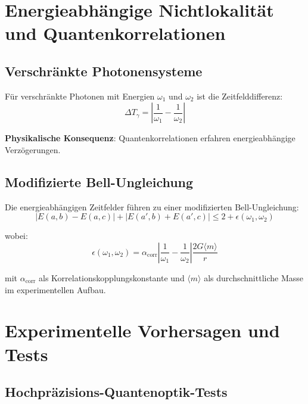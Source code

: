 	\section{Energieabhängige Nichtlokalität und Quantenkorrelationen}
	
	\subsection{Verschränkte Photonensysteme}
	
	Für verschränkte Photonen mit Energien $\omega_1$ und $\omega_2$ ist die Zeitfelddifferenz:
	\begin{equation}
		\Delta T_\gamma = \left|\frac{1}{\omega_1} - \frac{1}{\omega_2}\right|
		\label{eq:time_field_difference}
	\end{equation}
	
	\textbf{Physikalische Konsequenz}: Quantenkorrelationen erfahren energieabhängige Verzögerungen.
	
	\subsection{Modifizierte Bell-Ungleichung}
	
	Die energieabhängigen Zeitfelder führen zu einer modifizierten Bell-Ungleichung:
	\begin{equation}
		|E(a,b) - E(a,c)| + |E(a',b) + E(a',c)| \leq 2 + \epsilon(\omega_1, \omega_2)
		\label{eq:modified_bell_inequality}
	\end{equation}
	
	wobei:
	\begin{equation}
		\epsilon(\omega_1, \omega_2) = \alpha_{\text{corr}} \left|\frac{1}{\omega_1} - \frac{1}{\omega_2}\right| \frac{2G\langle m \rangle}{r}
		\label{eq:bell_correction}
	\end{equation}
	
	mit $\alpha_{\text{corr}}$ als Korrelationskopplungskonstante und $\langle m \rangle$ als durchschnittliche Masse im experimentellen Aufbau.

	\section{Experimentelle Vorhersagen und Tests}
	
	\subsection{Hochpräzisions-Quantenoptik-Tests}
	
